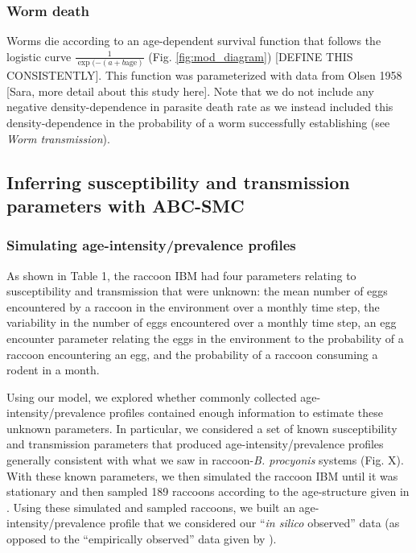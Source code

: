 \documentclass[11pt]{article}
\begin{document}
\subsubsection{Worm death}

Worms die according to an age-dependent survival function that follows the logistic curve $\frac{1}{\exp(-(a + b \text{age})}$ (Fig. \ref{fig:mod_diagram}) [DEFINE THIS CONSISTENTLY]. This function was parameterized with data from Olsen 1958 [Sara, more detail about this study here].  Note that we do not include any negative density-dependence in parasite death rate as we instead included this density-dependence in the probability of a worm successfully establishing (see \emph{Worm transmission}).

\subsection{Inferring susceptibility and transmission parameters with ABC-SMC}

\subsubsection{Simulating age-intensity/prevalence profiles}

As shown in Table 1, the raccoon IBM had four parameters relating to susceptibility and transmission that were unknown: 
the mean number of eggs encountered by a raccoon in the environment over
a monthly time step, the variability in the number of eggs encountered
over a monthly time step, an egg encounter parameter relating the eggs
in the environment to the probability of a raccoon encountering an egg, and
the probability of a raccoon consuming a rodent in a month.

Using our model, we explored whether commonly collected age-intensity/prevalence profiles contained enough information to estimate these unknown parameters.  In particular, we considered a set of known susceptibility and transmission parameters that produced age-intensity/prevalence profiles generally consistent with what we saw in raccoon-\emph{B. procyonis} systems (Fig. X).  With these known parameters, we then simulated the raccoon IBM until it was stationary and then sampled 189 raccoons according to the age-structure given in \cite{Weinstein2016}.  Using these simulated and sampled raccoons, we built an age-intensity/prevalence profile that we considered our ``\emph{in silico} observed'' data (as opposed to the ``empirically observed'' data given by \cite{Weinstein2016}).
\end{document}
